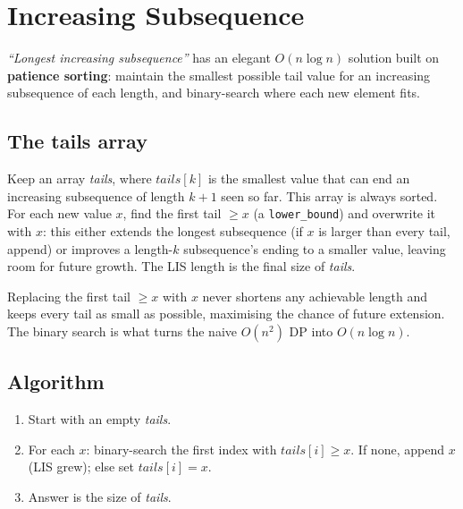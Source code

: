 \section{Increasing Subsequence}
\label{sec:cses-increasing-subsequence}


\begin{patternbox}
\emph{``Longest increasing subsequence''} has an elegant
$O(n\log n)$ solution built on \textbf{patience sorting}: maintain the
smallest possible tail value for an increasing subsequence of each
length, and binary-search where each new element fits.
\end{patternbox}

\subsection*{The tails array}

Keep an array \textit{tails}, where $\textit{tails}[k]$ is the smallest
value that can end an increasing subsequence of length $k+1$ seen so far.
This array is always sorted. For each new value $x$, find the first tail
$\ge x$ (a \texttt{lower\_bound}) and overwrite it with $x$: this either
extends the longest subsequence (if $x$ is larger than every tail,
append) or improves a length-$k$ subsequence's ending to a smaller value,
leaving room for future growth. The LIS length is the final size of
\textit{tails}.

\begin{ideabox}
Replacing the first tail $\ge x$ with $x$ never shortens any achievable
length and keeps every tail as small as possible, maximising the chance of
future extension. The binary search is what turns the naive $O(n^2)$ DP
into $O(n\log n)$.
\end{ideabox}

\subsection*{Algorithm}

\begin{enumerate}
  \item Start with an empty \textit{tails}.
  \item For each $x$: binary-search the first index with
        $\textit{tails}[i]\ge x$. If none, append $x$ (LIS grew); else
        set $\textit{tails}[i]=x$.
  \item Answer is the size of \textit{tails}.
\end{enumerate}

